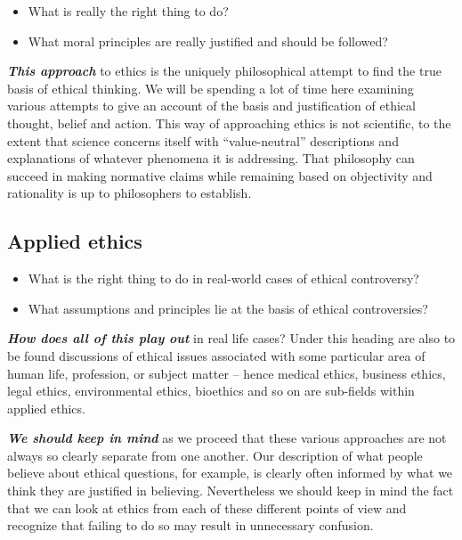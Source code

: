 \documentclass[12pt, openany]{book}
\makeatletter
\providecommand{\tightlist}{%
  \setlength{\itemsep}{0pt}\setlength{\parskip}{0pt}}
\newenvironment{kframe}{%
\medskip{}
\setlength{\fboxsep}{.8em}
 \def\at@end@of@kframe{}%
 \ifinner\ifhmode%
  \def\at@end@of@kframe{\end{minipage}}%
  \begin{minipage}{\columnwidth}%
 \fi\fi%
 \def\FrameCommand##1{\hskip\@totalleftmargin \hskip-\fboxsep
 \colorbox{shadecolor}{##1}\hskip-\fboxsep
     \hskip-\linewidth \hskip-\@totalleftmargin \hskip\columnwidth}%
 \MakeFramed {\advance\hsize-\width
   \@totalleftmargin\z@ \linewidth\hsize
   \@setminipage}}%
 {\par\unskip\endMakeFramed%
 \at@end@of@kframe}
\newenvironment{rmdblock}[1]
  {
  \begin{itemize}
  \renewcommand{\labelitemi}{
    \raisebox{-.7\height}[0pt][0pt]{
      {\setkeys{Gin}{width=3em,keepaspectratio}\texttt{[image: img/\#1]}}
    }
  }
  \setlength{\fboxsep}{1em}
  \begin{kframe}
  \item
  }
  {
  \end{kframe}
  \end{itemize}
  }
\newenvironment{question}
  {\begin{rmdblock}{question}}
  {\end{rmdblock}}
\makeatother
\begin{document}
\begin{question}

\begin{itemize}
\tightlist
\item
  What is really the right thing to do?
\item
  What moral principles are really justified and should be followed?
\end{itemize}

\end{question}

\textbf{\emph{This approach}} to ethics is the uniquely philosophical attempt to find the true basis of ethical thinking. We will be spending a lot of time here examining various attempts to give an account of the basis and justification of ethical thought, belief and action. This way of approaching ethics is not scientific, to the extent that science concerns itself with ``value-neutral'' descriptions and explanations of whatever phenomena it is addressing. That philosophy can succeed in making normative claims while remaining based on objectivity and rationality is up to philosophers to establish.

\hypertarget{applied-ethics}{%
\subsection*{Applied ethics}\label{applied-ethics}}


\begin{question}

\begin{itemize}
\tightlist
\item
  What is the right thing to do in real-world cases of ethical controversy?
\item
  What assumptions and principles lie at the basis of ethical controversies?
\end{itemize}

\end{question}

\textbf{\emph{How does all of this play out}} in real life cases? Under this heading are also to be found discussions of ethical issues associated with some particular area of human life, profession, or subject matter -- hence medical ethics, business ethics, legal ethics, environmental ethics, bioethics and so on are sub-fields within applied ethics.

\textbf{\emph{We should keep in mind}} as we proceed that these various approaches are not always so clearly separate from one another. Our description of what people believe about ethical questions, for example, is clearly often informed by what we think they are justified in believing. Nevertheless we should keep in mind the fact that we can look at ethics from each of these different points of view and recognize that failing to do so may result in unnecessary confusion.
\end{document}
